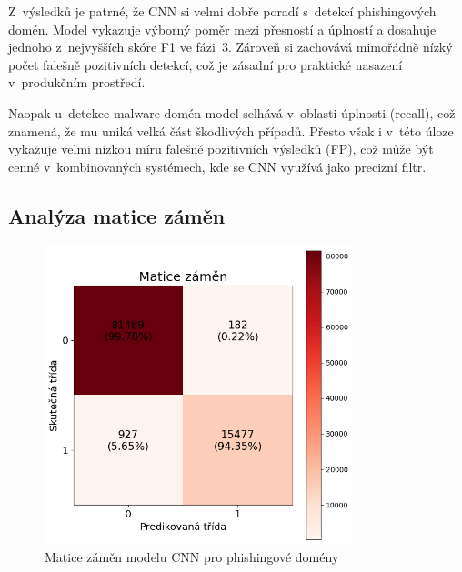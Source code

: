 Z~výsledků je patrné, že CNN si velmi dobře poradí s~detekcí phishingových domén. Model vykazuje výborný poměr mezi přesností a úplností a dosahuje jednoho z~nejvyšších skóre F1  ve fázi~3. Zároveň si zachovává mimořádně nízký počet falešně pozitivních detekcí, což je zásadní pro praktické nasazení v~produkčním prostředí.

Naopak u~detekce malware domén model selhává v~oblasti úplnosti (recall), což znamená, že mu uniká velká část škodlivých případů. Přesto však i v~této úloze vykazuje velmi nízkou míru falešně pozitivních výsledků (FP), což může být cenné v~kombinovaných systémech, kde se CNN využívá jako precizní filtr.

\subsection{Analýza matice záměn}

\begin{figure}[H]
    \centering
    \includegraphics[width=0.8\textwidth]{obrazky-figures/cnn_stage_3_phishing_v1.1_confusion_matrix.png}
    \caption{Matice záměn modelu CNN pro phishingové domény}
    \label{fig:cnn_conf_matrix_phishing}
\end{figure}

